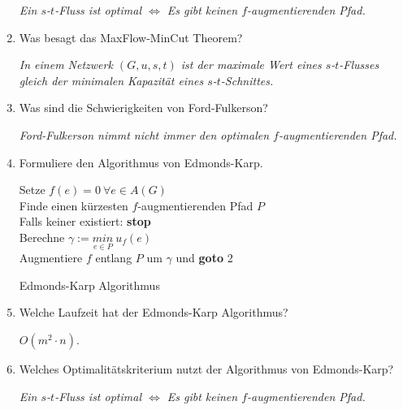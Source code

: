 \documentclass[a4paper,10pt]{scrreprt}
\begin{document}
\begin{enumerate}
		\textit{Ein $s$-$t$-Fluss ist optimal $\Leftrightarrow$ Es gibt keinen $f$-augmentierenden Pfad.}
		\item Was besagt das MaxFlow-MinCut Theorem?
			
		\textit{In einem Netzwerk $(G, u, s, t)$ ist der maximale Wert eines $s$-$t$-Flusses gleich der minimalen Kapazität eines $s$-$t$-Schnittes.}
		\item Was sind die Schwierigkeiten von Ford-Fulkerson?
		
		\textit{Ford-Fulkerson nimmt nicht immer den optimalen $f$-augmentierenden Pfad.}
		\item Formuliere den Algorithmus von Edmonds-Karp.
		\begin{algorithm}
			\vspace*{5pt}
			Setze $f(e)=0~\forall e\in A(G)$\\
			Finde einen kürzesten $f$-augmentierenden Pfad $P$\\
			\hspace*{15pt}Falls keiner existiert: \textbf{stop} \\
			Berechne $\gamma := \underset{e\in P}{min}~ u_f(e)$\\
			\hspace*{15pt}Augmentiere $f$ entlang $P$ um $\gamma$ und \textbf{goto} 2
			\caption{Edmonds-Karp Algorithmus}
		\end{algorithm}
		\item Welche Laufzeit hat der Edmonds-Karp Algorithmus?
		
		$O(m^2 \cdot n)$.
		\item Welches Optimalitätskriterium nutzt der Algorithmus von Edmonds-Karp?
		
		\textit{Ein $s$-$t$-Fluss ist optimal $\Leftrightarrow$ Es gibt keinen $f$-augmentierenden Pfad.}
	\end{enumerate}
\end{document}
